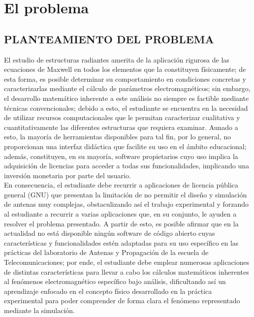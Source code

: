 
\chapter{El problema} %

\label{Capitulo1} %


\section{PLANTEAMIENTO DEL PROBLEMA}

El estudio de estructuras radiantes amerita de la aplicación rigurosa de las ecuaciones de Maxwell en todos los elementos que la constituyen físicamente; de esta forma, es posible determinar su comportamiento en condiciones concretas y caracterizarlas mediante el cálculo de parámetros electromagnéticos; sin embargo, el desarrollo matemático inherente a este análisis no siempre es factible mediante técnicas convencionales; debido a esto, el estudiante se encuentra en la necesidad de utilizar recursos computacionales que le permitan caracterizar cualitativa y cuantitativamente las diferentes estructuras que requiera examinar. Aunado a esto, la mayoría de herramientas disponibles para tal fin, por lo general, no proporcionan una interfaz didáctica que facilite su uso en el ámbito educacional; además, constituyen, en su mayoría, software propietarios cuyo uso implica la adquisición de licencias para  acceder a todas sus funcionalidades, implicando una inversión monetaria por parte del usuario.\\

En consecuencia, el estudiante debe recurrir a aplicaciones de licencia pública general (GNU) que presentan la limitación de no permitir el diseño y simulación de antenas muy complejas, obstaculizando así el trabajo experimental y forzando al estudiante a recurrir a varias aplicaciones que, en su conjunto, le ayuden a resolver el problema presentado. A partir de esto, es posible afirmar que en la actualidad no está disponible ningún software de código abierto cuyas características y funcionalidades estén adaptadas para su uso específico en las prácticas del laboratorio de Antenas y Propagación de la escuela de Telecomunicaciones; por ende, el estudiante debe emplear numerosas aplicaciones de distintas características para llevar a cabo los cálculos matemáticos inherentes al fenómenos electromagnético específico bajo análisis, dificultando así un aprendizaje enfocado en el concepto físico desarrollado en la práctica experimental para poder comprender de forma clara el fenómeno representado mediante la simulación. 

